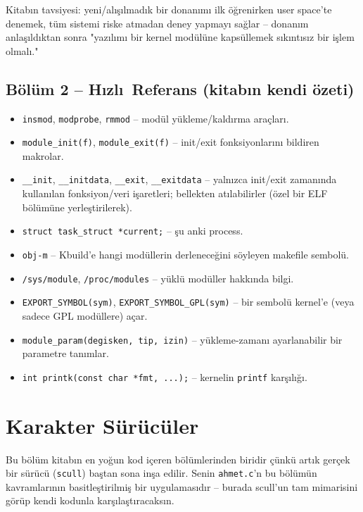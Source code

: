 \documentclass[11pt,a4paper]{article}
\begin{document}
Kitabın tavsiyesi: yeni/alışılmadık bir donanımı ilk öğrenirken user
space'te denemek, tüm sistemi riske atmadan deney yapmayı sağlar --
donanım anlaşıldıktan sonra "yazılımı bir kernel modülüne kapsüllemek
sıkıntısız bir işlem olmalı."

\subsection*{B\"ol\"um 2 -- H\i zl\i\ Referans (kitab\i n kendi \"ozeti)}
\begin{itemize}[leftmargin=1.2cm]
  \item \texttt{insmod}, \texttt{modprobe}, \texttt{rmmod} -- modül
  yükleme/kaldırma araçları.
  \item \texttt{module\_init(f)}, \texttt{module\_exit(f)} -- init/exit
  fonksiyonlarını bildiren makrolar.
  \item \texttt{\_\_init}, \texttt{\_\_initdata}, \texttt{\_\_exit},
  \texttt{\_\_exitdata} -- yalnızca init/exit zamanında kullanılan
  fonksiyon/veri işaretleri; bellekten atılabilirler (özel bir ELF
  bölümüne yerleştirilerek).
  \item \texttt{struct task\_struct *current;} -- şu anki process.
  \item \texttt{obj-m} -- Kbuild'e hangi modüllerin derleneceğini
  söyleyen makefile sembolü.
  \item \texttt{/sys/module}, \texttt{/proc/modules} -- yüklü modüller
  hakkında bilgi.
  \item \texttt{EXPORT\_SYMBOL(sym)}, \texttt{EXPORT\_SYMBOL\_GPL(sym)}
  -- bir sembolü kernel'e (veya sadece GPL modüllere) açar.
  \item \texttt{module\_param(degisken, tip, izin)} -- yükleme-zamanı
  ayarlanabilir bir parametre tanımlar.
  \item \texttt{int printk(const char *fmt, ...);} -- kernelin
  \texttt{printf} karşılığı.
\end{itemize}

\newpage

\section{Karakter S\"ur\"uc\"uler}
\label{sec:bolum3}

Bu bölüm kitabın en yoğun kod içeren bölümlerinden biridir çünkü artık
gerçek bir sürücü (\texttt{scull}) baştan sona inşa edilir. Senin
\texttt{ahmet.c}'n bu bölümün kavramlarının basitleştirilmiş bir
uygulamasıdır -- burada scull'un tam mimarisini görüp kendi kodunla
karşılaştıracaksın.
\end{document}

